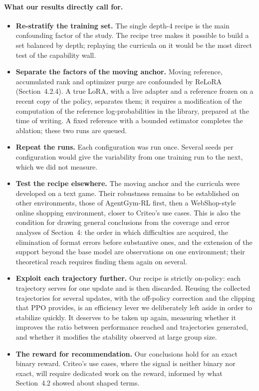 \documentclass[11pt,a4paper]{article}
\begin{document}
\paragraph{What our results directly call for.}
\begin{itemize}
    \item \textbf{Re-stratify the training set.} The single depth-4 recipe is the main confounding factor of the study. The recipe tree makes it possible to build a set balanced by depth; replaying the curricula on it would be the most direct test of the capability wall.
    \item \textbf{Separate the factors of the moving anchor.} Moving reference, accumulated rank and optimizer purge are confounded by ReLoRA (Section~4.2.4). A true LoRA, with a live adapter and a reference frozen on a recent copy of the policy, separates them; it requires a modification of the computation of the reference log-probabilities in the library, prepared at the time of writing. A fixed reference with a bounded estimator completes the ablation; these two runs are queued.
    \item \textbf{Repeat the runs.} Each configuration was run once. Several seeds per configuration would give the variability from one training run to the next, which we did not measure.
    \item \textbf{Test the recipe elsewhere.} The moving anchor and the curricula were developed on a text game. Their robustness remains to be established on other environments, those of AgentGym-RL first, then a WebShop-style online shopping environment, closer to Criteo's use cases. This is also the condition for drawing general conclusions from the coverage and error analyses of Section~4: the order in which difficulties are acquired, the elimination of format errors before substantive ones, and the extension of the support beyond the base model are observations on one environment; their theoretical reach requires finding them again on several.
    \item \textbf{Exploit each trajectory further.} Our recipe is strictly on-policy: each trajectory serves for one update and is then discarded. Reusing the collected trajectories for several updates, with the off-policy correction and the clipping that PPO provides, is an efficiency lever we deliberately left aside in order to stabilize quickly. It deserves to be taken up again, measuring whether it improves the ratio between performance reached and trajectories generated, and whether it modifies the stability observed at large group size.
    \item \textbf{The reward for recommendation.} Our conclusions hold for an exact binary reward. Criteo's use cases, where the signal is neither binary nor exact, will require dedicated work on the reward, informed by what Section~4.2 showed about shaped terms.
\end{itemize}
\end{document}

